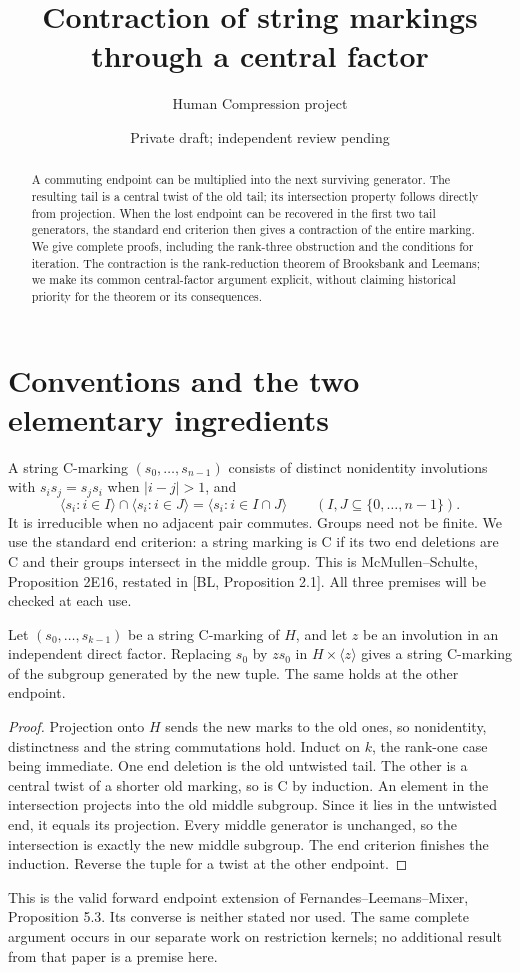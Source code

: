 \documentclass[a4paper,11pt]{article}
\title{Contraction of string markings through a central factor}
\author{Human Compression project}\date{Private draft; independent review pending}
\newcommand{\gen}[1]{\langle#1\rangle}
\begin{document}
\maketitle
\begin{abstract}
A commuting endpoint can be multiplied into the next surviving generator.
The resulting tail is a central twist of the old tail; its intersection
property follows directly from projection. When the lost endpoint can be
recovered in the first two tail generators, the standard end criterion
then gives a contraction of the entire marking. We give complete proofs,
including the rank-three obstruction and the conditions for iteration.
The contraction is the rank-reduction theorem of Brooksbank and Leemans;
we make its common central-factor argument explicit, without claiming
historical priority for the theorem or its consequences.
\end{abstract}

\section{Conventions and the two elementary ingredients}
A string C-marking $(s_0,\ldots,s_{n-1})$ consists of distinct nonidentity
involutions with $s_i s_j=s_j s_i$ when $|i-j|>1$, and
\[
 \gen{s_i:i\in I}\cap\gen{s_i:i\in J}=\gen{s_i:i\in I\cap J}
 \qquad(I,J\subseteq\{0,\ldots,n-1\}).
\]
It is irreducible when no adjacent pair commutes. Groups need not be finite.
We use the standard end criterion: a string marking is C if its two end
deletions are C and their groups intersect in the middle group. This is
McMullen--Schulte, Proposition 2E16, restated in [BL, Proposition 2.1].
All three premises will be checked at each use.

\begin{lemma}\label{central}
Let $(s_0,\ldots,s_{k-1})$ be a string C-marking of $H$, and let $z$ be
an involution in an independent direct factor. Replacing $s_0$ by $zs_0$
in $H\times\gen z$ gives a string C-marking of the subgroup generated
by the new tuple. The same holds at the other endpoint.
\end{lemma}
\begin{proof}
Projection onto $H$ sends the new marks to the old ones, so nonidentity,
distinctness and the string commutations hold. Induct on $k$, the rank-one
case being immediate. One end deletion is the old untwisted tail. The
other is a central twist of a shorter old marking, so is C by induction.
An element in the intersection projects into the old middle subgroup.
Since it lies in the untwisted end, it equals its projection. Every middle
generator is unchanged, so the intersection is exactly the new middle
subgroup. The end criterion finishes the induction. Reverse the tuple
for a twist at the other endpoint.
\end{proof}
This is the valid forward endpoint extension of Fernandes--Leemans--Mixer,
Proposition 5.3. Its converse is neither stated nor used. The same complete
argument occurs in our separate work on restriction kernels; no additional
result from that paper is a premise here.
\end{document}
